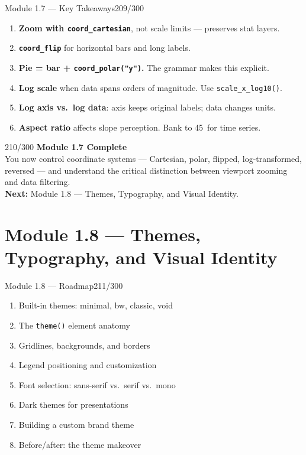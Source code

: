 \documentclass[10pt]{beamer}
\newcommand{\smark}[1]{\hfill{\scriptsize\color{codegray}#1}}
\begin{document}
\begin{frame}{Module 1.7 --- Key Takeaways}\smark{209/300}
\begin{enumerate}
    \item \textbf{Zoom with \texttt{coord\_cartesian}}, not scale limits --- preserves stat layers.
    \item \textbf{\texttt{coord\_flip}} for horizontal bars and long labels.
    \item \textbf{Pie = bar + \texttt{coord\_polar("y")}.} The grammar makes this explicit.
    \item \textbf{Log scale} when data spans orders of magnitude. Use \texttt{scale\_x\_log10()}.
    \item \textbf{Log axis vs.\ log data}: axis keeps original labels; data changes units.
    \item \textbf{Aspect ratio} affects slope perception. Bank to 45\textdegree\ for time series.
\end{enumerate}
\end{frame}

\begin{frame}{}\smark{210/300}
\centering\vspace{1.5cm}
{\Large\textbf{Module 1.7 Complete}}\\[0.5cm]
You now control coordinate systems --- Cartesian, polar, flipped, log-transformed, reversed --- and understand the critical distinction between viewport zooming and data filtering.\\[0.5cm]
\textbf{Next:} Module 1.8 --- Themes, Typography, and Visual Identity.
\end{frame}

\section{Module 1.8 --- Themes, Typography, and Visual Identity}

\begin{frame}{Module 1.8 --- Roadmap}\smark{211/300}
\begin{enumerate}
    \item Built-in themes: minimal, bw, classic, void
    \item The \texttt{theme()} element anatomy
    \item Gridlines, backgrounds, and borders
    \item Legend positioning and customization
    \item Font selection: sans-serif vs.\ serif vs.\ mono
    \item Dark themes for presentations
    \item Building a custom brand theme
    \item Before/after: the theme makeover
\end{enumerate}
\end{frame}
\end{document}
